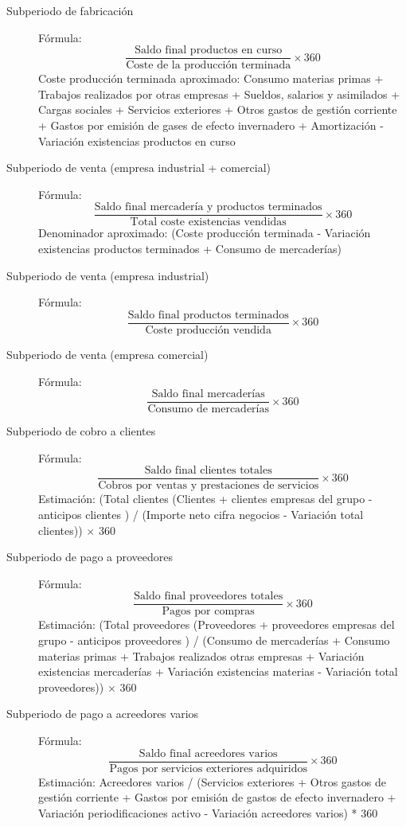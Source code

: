 \documentclass[12pt]{book} %
\begin{document}
\begin{description}
\item[Subperiodo de fabricación]
Fórmula: $$\displaystyle \frac{\text{Saldo final productos en curso}}{\text{Coste de la producción terminada}}\times 360$$
Coste producción terminada aproximado: Consumo materias primas + Trabajos realizados por otras empresas + Sueldos, salarios y asimilados + Cargas sociales + Servicios exteriores + Otros gastos de gestión corriente + Gastos por emisión de gases de efecto invernadero + Amortización - Variación existencias productos en curso

\item[Subperiodo de venta (empresa industrial + comercial)]
Fórmula: $$\displaystyle \frac{\text{Saldo final mercadería y productos terminados}}{\text{Total coste existencias vendidas}}\times 360$$
Denominador aproximado: (Coste producción terminada - Variación existencias productos terminados + Consumo de mercaderías)

\item[Subperiodo de venta (empresa industrial)]
Fórmula: $$\displaystyle \frac{\text{Saldo final productos terminados}}{\text{Coste producción vendida}}\times 360$$

\item[Subperiodo de venta (empresa comercial)]
Fórmula: $$\displaystyle \frac{\text{Saldo final mercaderías}}{\text{Consumo de mercaderías}}\times 360$$

\item[Subperiodo de cobro a clientes]
Fórmula: $$\displaystyle \frac{\text{Saldo final clientes totales}}{\text{Cobros por ventas y prestaciones de servicios}}\times 360$$
Estimación: (Total clientes (Clientes + clientes empresas del grupo - anticipos clientes ) / (Importe neto cifra negocios - Variación total clientes)) $\times$ 360

\item[Subperiodo de pago a proveedores]
Fórmula: $$\displaystyle \frac{\text{Saldo final proveedores totales}}{\text{Pagos por compras}}\times 360$$
Estimación: (Total proveedores (Proveedores + proveedores empresas del grupo - anticipos proveedores ) / (Consumo de mercaderías + Consumo materias primas + Trabajos realizados otras empresas + Variación existencias mercaderías + Variación existencias materias - Variación total proveedores)) $\times$ 360

\item[Subperiodo de pago a acreedores varios]
Fórmula: $$\displaystyle \frac{\text{Saldo final acreedores varios}}{\text{Pagos por servicios exteriores adquiridos}}\times 360$$
Estimación: Acreedores varios / (Servicios exteriores + Otros gastos de gestión corriente + Gastos por emisión de gastos de efecto invernadero + Variación periodificaciones activo - Variación acreedores varios) * 360
\end{description}
\end{document}
